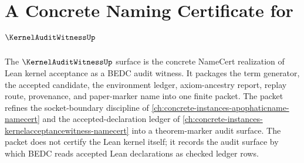 \chapter{A Concrete Naming Certificate for $\KernelAuditWitnessUp$}
\label{ch:concrete-instances-kernel-audit-witness-namecert}

The $\KernelAuditWitnessUp$ surface is the concrete NameCert realization of Lean kernel acceptance as a BEDC audit witness. It packages the term generator, the accepted candidate, the environment ledger, axiom-ancestry report, replay route, provenance, and paper-marker name into one finite packet. The packet refines the socket-boundary discipline of \autoref{ch:concrete-instances-apophaticname-namecert} and the accepted-declaration ledger of \autoref{ch:concrete-instances-kernelacceptancewitness-namecert} into a theorem-marker audit surface. The packet does not certify the Lean kernel itself; it records the audit surface by which BEDC reads accepted Lean declarations as checked ledger rows.

